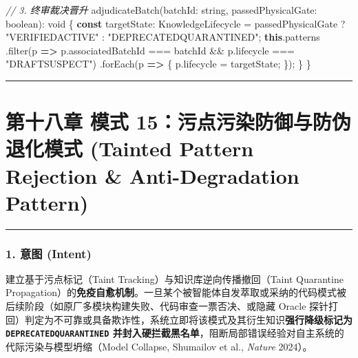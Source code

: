 \documentclass[
]{ctexart}
\newenvironment{Shaded}{}{}
\newcommand{\AttributeTok}[1]{\textcolor[rgb]{0.49,0.56,0.16}{#1}}
\newcommand{\CommentTok}[1]{\textcolor[rgb]{0.38,0.63,0.69}{\textit{#1}}}
\newcommand{\DataTypeTok}[1]{\textcolor[rgb]{0.56,0.13,0.00}{#1}}
\newcommand{\FunctionTok}[1]{\textcolor[rgb]{0.02,0.16,0.49}{#1}}
\newcommand{\KeywordTok}[1]{\textcolor[rgb]{0.00,0.44,0.13}{\textbf{#1}}}
\newcommand{\NormalTok}[1]{#1}
\newcommand{\OperatorTok}[1]{\textcolor[rgb]{0.40,0.40,0.40}{#1}}
\newcommand{\StringTok}[1]{\textcolor[rgb]{0.25,0.44,0.63}{#1}}
\renewcommand{\_}{\discretionary{}{}{\textunderscore}}
\let\oldsection\section
\renewcommand{\section}{\clearpage\oldsection}
\begin{document}
\begin{Shaded}
\begin{Highlighting}[]
  \CommentTok{// 3. 终审裁决晋升}
  \FunctionTok{adjudicateBatch}\NormalTok{(batchId}\OperatorTok{:} \DataTypeTok{string}\OperatorTok{,}\NormalTok{ passedPhysicalGate}\OperatorTok{:} \DataTypeTok{boolean}\NormalTok{)}\OperatorTok{:} \DataTypeTok{void}\NormalTok{ \{}
    \KeywordTok{const}\NormalTok{ targetState}\OperatorTok{:}\NormalTok{ KnowledgeLifecycle }\OperatorTok{=}\NormalTok{ passedPhysicalGate }\OperatorTok{?} \StringTok{"VERIFIED\_ACTIVE"} \OperatorTok{:} \StringTok{"DEPRECATED\_QUARANTINED"}\OperatorTok{;}
    \KeywordTok{this}\OperatorTok{.}\AttributeTok{patterns}
      \OperatorTok{.}\FunctionTok{filter}\NormalTok{(p }\KeywordTok{=\textgreater{}}\NormalTok{ p}\OperatorTok{.}\AttributeTok{associatedBatchId} \OperatorTok{===}\NormalTok{ batchId }\OperatorTok{\&\&}\NormalTok{ p}\OperatorTok{.}\AttributeTok{lifecycle} \OperatorTok{===} \StringTok{"DRAFT\_SUSPECT"}\NormalTok{)}
      \OperatorTok{.}\FunctionTok{forEach}\NormalTok{(p }\KeywordTok{=\textgreater{}}\NormalTok{ \{}
\NormalTok{        p}\OperatorTok{.}\AttributeTok{lifecycle} \OperatorTok{=}\NormalTok{ targetState}\OperatorTok{;}
\NormalTok{      \})}\OperatorTok{;}
\NormalTok{  \}}
\NormalTok{\}}
\end{Highlighting}
\end{Shaded}

\begin{center}\rule{0.5\linewidth}{0.5pt}\end{center}

\section{第十八章 模式 15：污点污染防御与防伪退化模式 (Tainted Pattern Rejection
\& Anti-Degradation
Pattern)}\label{ux6a21ux5f0f-15ux6c61ux70b9ux6c61ux67d3ux9632ux5fa1ux4e0eux9632ux4f2aux9000ux5316ux6a21ux5f0f-tainted-pattern-rejection-anti-degradation-pattern}

\begin{center}\rule{0.5\linewidth}{0.5pt}\end{center}

\subsubsection{1. 意图 (Intent)}\label{ux610fux56fe-intent-14}

建立基于污点标记（Taint Tracking）与知识库逆向传播撤回（Taint Quarantine
Propagation）的\textbf{免疫自愈机制}。一旦某个被智能体自发萃取或采纳的代码模式被后续阶段（如原厂多模块构建失败、代码审查一票否决、或隐藏
Oracle
探针打回）判定为不可靠或具备欺诈性，系统立即将该模式及其衍生知识\textbf{强行降级标记为
\texttt{DEPRECATED\_QUARANTINED}
并封入硬拦截黑名单}，阻断局部错误经验对自主系统的代际污染与模型坍缩（Model
Collapse, Shumailov et al., \emph{Nature} 2024）。
\end{document}
